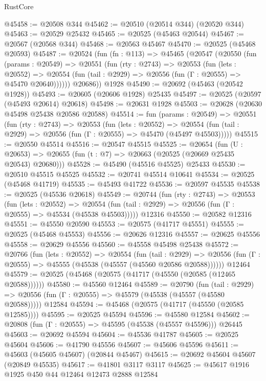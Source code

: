 \begin{lexlean}{RustCore}
\begin{coremodule}
@45458 := @20508 @344
@45462 := @20510 (@20514 @344) (@20520 @344)
@45463 := @20529 @25432
@45465 := @20525 (@45463 @20544)
@45467 := @20567 (@20568 @344)
@45468 := @20563 @45467
@45470 := @20525 (@45468 @20593)
@45487 := @20524
    (fun (fn : @113) =>
    @45465
      (@20547
        (@20550
          (fun (params : @20549) =>
          @20551
            (fun (rty : @2743) =>
            @20553
              (fun (lets : @20552) =>
              @20554 (fun (tail : @2929) => @20556 (fun (Γ : @20555) => @45470 @20640))))))
        @20686))
    @1928
@45490 := @20692 (@45463 (@20542 @1928))
@45493 := @20605 (@20606 @1928) @25435
@45497 := @20525 (@20597 (@45493 @20614) @20618)
@45498 := @20631 @1928
@45503 := @20628 (@20630 @45498 @25438 @20586 @20588)
@45514 := fun (params : @20549) =>
  @20551
    (fun (rty : @2743) =>
    @20553
      (fun (lets : @20552) =>
      @20554 (fun (tail : @2929) => @20556 (fun (Γ : @20555) => @45470 (@45497 @45503)))))
@45515 := @20550 @45514
@45516 := @20547 @45515
@45525 := @20654
    (fun (U : @20653) => @20655 (fun (t : @7) => @20663 (@20525 (@20669 @25435 @20543) @20680)))
@45528 := @45490 (@45516 @45525) @25433
@45530 := @20510 @45515 @45525
@45532 := @20741 @45514 @10641
@45534 := @20525 (@45468 @41719)
@45535 := @45493 @41722
@45536 := @20597 @45535
@45538 := @20525 (@45536 @20618)
@45549 := @20744
    (fun (rty : @2743) =>
    @20553
      (fun (lets : @20552) =>
      @20554 (fun (tail : @2929) => @20556 (fun (Γ : @20555) => @45534 (@45538 @45503)))))
    @12316
@45550 := @20582 @12316
@45551 := @45550 @20590
@45553 := @20575 (@41717 @45551)
@45555 := @20525 (@45468 @45553)
@45556 := @20626 @12316
@45557 := @20625 @45556
@45558 := @20629 @45556
@45560 := @45558 @45498 @25438
@45572 := @20766
    (fun (lets : @20552) =>
    @20554
      (fun (tail : @2929) =>
      @20556 (fun (Γ : @20555) => @45555 (@45538 (@45557 (@45560 @20586 @20588))))))
    @12464
@45579 := @20525 (@45468 (@20575 (@41717 (@45550 (@20585 (@12465 @20588))))))
@45580 := @45560 @12464
@45589 := @20790
    (fun (tail : @2929) => @20556 (fun (Γ : @20555) => @45579 (@45538 (@45557 (@45580 @20588)))))
    @12584
@45594 := @45468 (@20575 (@41717 (@45550 (@20585 @12585))))
@45595 := @20525 @45594
@45596 := @45580 @12584
@45602 := @20808 (fun (Γ : @20555) => @45595 (@45538 (@45557 @45596))) @26445
@45603 := @20692 @45594
@45604 := @45536 @41787
@45605 := @20525 @45604
@45606 := @41790 @45556
@45607 := @45606 @45596
@45611 := @45603 (@45605 @45607) (@20844 @45467)
@45615 := @20692 @45604 @45607 (@20849 @45535)
@45617 := @41801 @3117 @3117
@45625 := @45617 @1916 @1925 @450 @44 @12464 @12473 @2888 @12584

\end{coremodule}
\end{lexlean}
